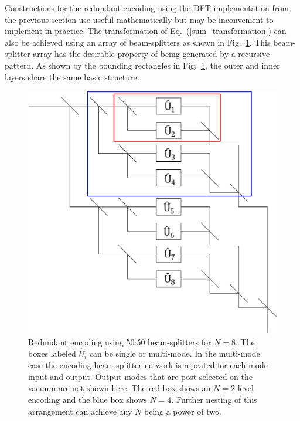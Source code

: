 \documentclass[aps,pra,twocolumn,superscriptaddress,numerical,floatfix]{revtex4-1}
\begin{document}
Constructions for the redundant encoding using the DFT implementation from the previous section use useful mathematically but may be inconvenient to implement in practice.  The transformation of Eq.~(\ref{sum_transformation}) can also be achieved using an array of beam-splitters as shown in Fig.~\ref{fig:gen system}.  This beam-splitter array has the desirable property of being generated by a recursive pattern.  As shown by the bounding rectangles in Fig.~\ref{fig:gen system}, the outer and inner layers share the same basic structure. 
%
\begin{figure}[tbh]
	\includegraphics[width=\columnwidth]{unitaries.pdf}
	\caption{\label{fig:gen system}Redundant encoding using 50:50 beam-splitters for $N=8$. The boxes labeled $\hat{U}_i$ can be single or multi-mode.  In the multi-mode case the encoding beam-splitter network is repeated for each mode input and output. Output modes that are post-selected on the vacuum are not shown here. The red box shows an $N=2$ level encoding and the blue box shows $N=4$.  Further nesting of this arrangement can achieve any $N$ being a power of two.}
\end{figure}
	
	
\end{document}
